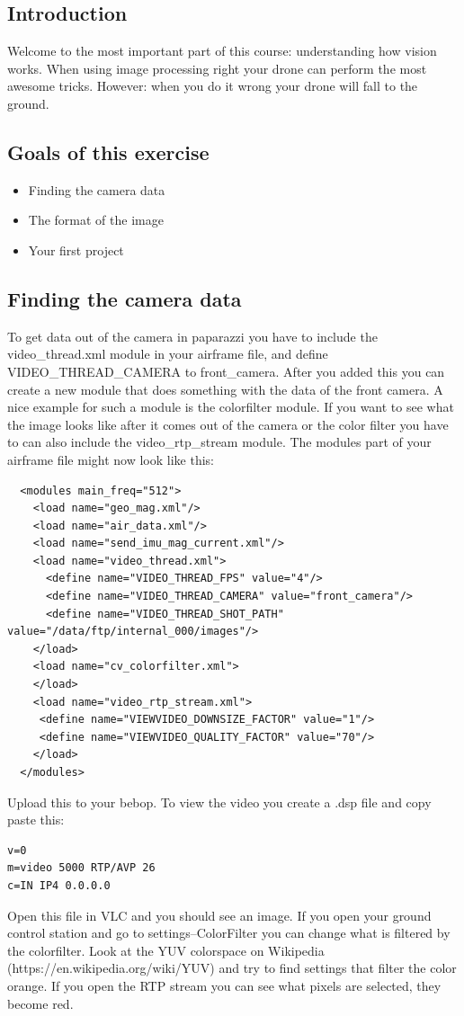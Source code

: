 \documentclass{article}
\begin{document}

\subsection*{Introduction}
Welcome to the most important part of this course: understanding how vision works. When using image processing right your drone can perform the most awesome tricks. However: when you do it wrong your drone will fall to the ground. 

\subsection*{Goals of this exercise}
\begin{itemize}
\item Finding the camera data
\item The format of the image
\item Your first project
\end{itemize}

\subsection*{Finding the camera data}
To get data out of the camera in paparazzi you have to include the video\_thread.xml module in your airframe file, and define VIDEO\_THREAD\_CAMERA to front\_camera. After you added this you can create a new module that does something with the data of the front camera. A nice example for such a module is the colorfilter module.
If you want to see what the image looks like after it comes out of the camera or the color filter you have to can also include the video\_rtp\_stream  module. 
The modules part of your airframe file might now look like this:
\begin{verbatim}
  <modules main_freq="512">
    <load name="geo_mag.xml"/>
    <load name="air_data.xml"/>
    <load name="send_imu_mag_current.xml"/>
    <load name="video_thread.xml">
      <define name="VIDEO_THREAD_FPS" value="4"/>
      <define name="VIDEO_THREAD_CAMERA" value="front_camera"/>
      <define name="VIDEO_THREAD_SHOT_PATH" value="/data/ftp/internal_000/images"/>
    </load>
    <load name="cv_colorfilter.xml">
    </load>
    <load name="video_rtp_stream.xml">
     <define name="VIEWVIDEO_DOWNSIZE_FACTOR" value="1"/>
     <define name="VIEWVIDEO_QUALITY_FACTOR" value="70"/>
    </load>
  </modules>
\end{verbatim}
Upload this to your bebop. To view the video you create a .dsp file and copy paste this:
\begin{verbatim}
v=0
m=video 5000 RTP/AVP 26
c=IN IP4 0.0.0.0
\end{verbatim}
Open this file in VLC and you should see an image. 
If you open your ground control station and go to settings--ColorFilter you can change what is filtered by the colorfilter. Look at the YUV colorspace on Wikipedia (https://en.wikipedia.org/wiki/YUV) and try to find settings that filter the color orange. If you open the RTP stream you can see what pixels are selected, they become red. 
\end{document}
